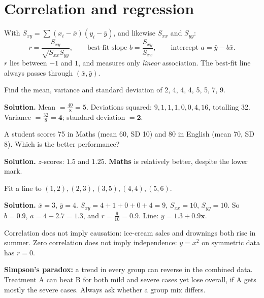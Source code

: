 \documentclass[11pt,a4paper,openany]{report}
\begin{document}
\section{Correlation and regression}
With $S_{xy}=\sum(x_i-\bar x)(y_i-\bar y)$, and likewise $S_{xx}$ and $S_{yy}$:
\[r=\frac{S_{xy}}{\sqrt{S_{xx}S_{yy}}},\qquad\text{best-fit slope }b=\frac{S_{xy}}{S_{xx}},\qquad\text{intercept }a=\bar y-b\bar x.\]
$r$ lies between $-1$ and $1$, and measures only \emph{linear} association. The best-fit line always passes through $(\bar x,\bar y)$.

\begin{example}
Find the mean, variance and standard deviation of 2, 4, 4, 4, 5, 5, 7, 9.

\textbf{Solution.} Mean $=\frac{40}8=5$. Deviations squared: $9,1,1,1,0,0,4,16$, totalling 32. Variance $=\frac{32}8=\mathbf{4}$; standard deviation $=\mathbf{2}$.
\end{example}

\begin{example}
A student scores 75 in Maths (mean 60, SD 10) and 80 in English (mean 70, SD 8). Which is the better performance?

\textbf{Solution.} $z$-scores: $1.5$ and $1.25$. \textbf{Maths} is relatively better, despite the lower mark.
\end{example}

\begin{example}[regression]
Fit a line to $(1,2),(2,3),(3,5),(4,4),(5,6)$.

\textbf{Solution.} $\bar x=3$, $\bar y=4$. $S_{xy}=4+1+0+0+4=9$, $S_{xx}=10$, $S_{yy}=10$. So $b=0.9$, $a=4-2.7=1.3$, and $r=\frac9{10}=0.9$. Line: $y=\mathbf{1.3+0.9x}$.
\end{example}

\begin{trap}
Correlation does not imply causation: ice-cream sales and drownings both rise in summer. Zero correlation does not imply independence: $y=x^2$ on symmetric data has $r=0$.

\textbf{Simpson's paradox:} a trend in every group can reverse in the combined data. Treatment A can beat B for both mild and severe cases yet lose overall, if A gets mostly the severe cases. Always ask whether a group mix differs.
\end{trap}
\end{document}
